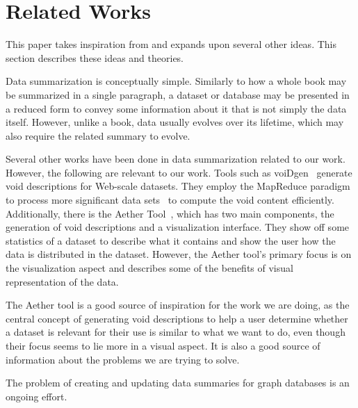\section{Related Works}\label{sec:related-works}
This paper takes inspiration from and expands upon several other ideas. This section describes these ideas and theories.

Data summarization is conceptually simple. Similarly to how a whole book may be summarized in a single paragraph, a dataset or database may be presented in a reduced form to convey some information about it that is not simply the data itself. However, unlike a book, data usually evolves over its lifetime, which may also require the related summary to evolve.

Several other works have been done in data summarization related to our work. However, the following are relevant to our work. Tools such as voiDgen~\cite{creating-void-descriptions} generate \gls{void} descriptions for Web-scale datasets. They employ the MapReduce paradigm to process more significant data sets~\cite{the-mapreduce-paradigm} to compute the \gls{void} content efficiently.
Additionally, there is the Aether Tool~\cite{aether-tool}, which has two main components, the generation of \gls{void} descriptions and a visualization interface. They show off some statistics of a dataset to describe what it contains and show the user how the data is distributed in the dataset. However, the Aether tool's primary focus is on the visualization aspect and describes some of the benefits of visual representation of the data.

The Aether tool is a good source of inspiration for the work we are doing, as the central concept of generating \gls{void} descriptions to help a user determine whether a dataset is relevant for their use is similar to what we want to do, even though their focus seems to lie more in a visual aspect. It is also a good source of information about the problems we are trying to solve.

The problem of creating and updating data summaries for graph databases is an ongoing effort.


